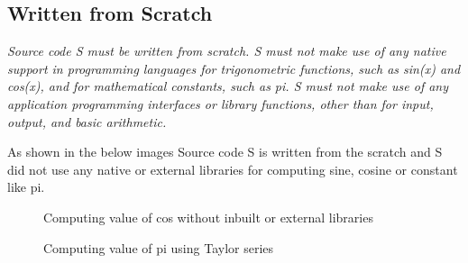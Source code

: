 \subsection{Written from Scratch}
\begin{flushleft}
  \textit{Source code S must be written from scratch. S must not make use of any native support in programming languages for trigonometric functions, such as sin(x) and cos(x), and for mathematical constants, such as pi. S must not make use of any application programming interfaces or library functions, other than for input, output, and basic arithmetic.}
\end{flushleft}
\begin{flushleft}
    As shown in the below images Source code S is written from the scratch and S did not use any native or external libraries for computing sine, cosine or constant like pi.
\end{flushleft}
\begin{figure}[h!]
    \centering
    \vspace{.5cm}
    \caption{Computing value of cos without inbuilt or external libraries}
    \label{fig:cos }
  \end{figure}
  \begin{figure}[h!]
    \centering
    \vspace{.5cm}
    \caption{Computing value of pi using Taylor series}
    \label{fig:pi }
  \end{figure}
  \pagebreak
